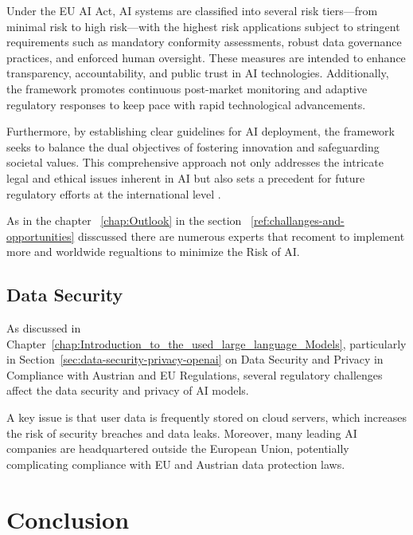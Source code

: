 Under the EU AI Act, AI systems are classified into several risk tiers—from minimal risk to high risk—with the highest risk applications subject to stringent requirements such as mandatory conformity assessments, robust data governance practices, and enforced human oversight. These measures are intended to enhance transparency, accountability, and public trust in AI technologies. Additionally, the framework promotes continuous post-market monitoring and adaptive regulatory responses to keep pace with rapid technological advancements.

Furthermore, by establishing clear guidelines for AI deployment, the framework seeks to balance the dual objectives of fostering innovation and safeguarding societal values. This comprehensive approach not only addresses the intricate legal and ethical issues inherent in AI but also sets a precedent for future regulatory efforts at the international level \cite{EURegFrameworkAI}.

As in the chapter ~\ref{chap:Outlook} in the section ~\ref{ref:challanges-and-opportunities} disscussed there are numerous experts
that recoment to implement more and worldwide regualtions to minimize the Risk of AI.


\subsection{Data Security}

As discussed in Chapter~\ref{chap:Introduction_to_the_used_large_language_Models}, particularly in Section~\ref{sec:data-security-privacy-openai} on Data Security and Privacy in Compliance with Austrian and EU Regulations, several regulatory challenges affect the data security and privacy of AI models.

A key issue is that user data is frequently stored on cloud servers, which increases the risk of security breaches and data leaks. Moreover, many leading AI companies are headquartered outside the European Union, potentially complicating compliance with EU and Austrian data protection laws.

\section{Conclusion}

